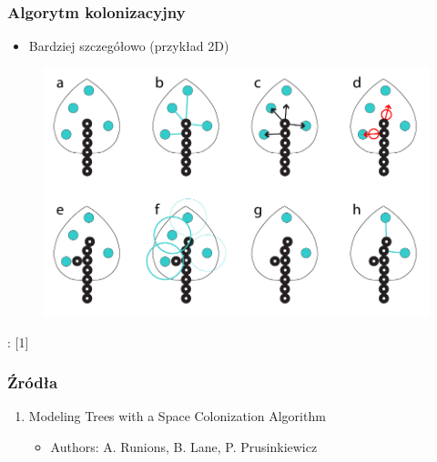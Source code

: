 \documentclass[blue,table]{beamer}
\begin{document}
\begin{frame}\frametitle{Algorytm kolonizacyjny}
\begin{itemize}
\item{Bardziej szczegółowo (przykład 2D)}
\end{itemize}
\begin{figure}
\includegraphics[scale=0.35]{img/colonization_9.png} 
\end{figure}
\begin{footnotesize}
: [1]
\end{footnotesize}
\end{frame}

\begin{frame}\frametitle{Źródła}
\begin{enumerate}
\item{Modeling Trees with a Space Colonization Algorithm}
\begin{itemize}
\item{Authors: A. Runions, B. Lane, P. Prusinkiewicz}
\end{itemize}
\end{enumerate}
\end{frame}
\end{document}
